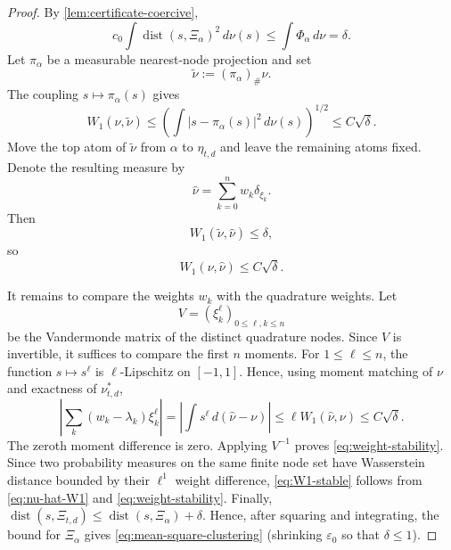 \documentclass[10pt,a4paper]{amsart}
\begin{document}
\begin{proof}
By \cref{lem:certificate-coercive},
\[
 c_0\int\operatorname{dist}(s,\Xi_\alpha)^2\,d\nu(s)
 \le\int\Phi_\alpha\,d\nu
 =\delta.
\]
Let $\pi_\alpha$ be a measurable nearest-node projection and set
\[
 \widetilde\nu:=(\pi_\alpha)_\#\nu.
\]
The coupling $s\mapsto\pi_\alpha(s)$ gives
\begin{equation}\label{eq:projection-W1}
 W_1(\nu,\widetilde\nu)
 \le\left(\int|s-\pi_\alpha(s)|^2\,d\nu(s)\right)^{1/2}
 \le C\sqrt\delta.
\end{equation}
Move the top atom of $\widetilde\nu$ from $\alpha$ to $\eta_{t,d}$ and leave the remaining atoms fixed.  Denote the resulting measure by
\[
 \widehat\nu=\sum_{k=0}^n w_k\delta_{\xi_k}.
\]
Then
\[
 W_1(\widetilde\nu,\widehat\nu)\le\delta,
\]
so
\begin{equation}\label{eq:nu-hat-W1}
 W_1(\nu,\widehat\nu)\le C\sqrt\delta.
\end{equation}

It remains to compare the weights $w_k$ with the quadrature weights.  Let
\[
 V=(\xi_k^\ell)_{0\le\ell,k\le n}
\]
be the Vandermonde matrix of the distinct quadrature nodes.  Since $V$ is invertible, it suffices to compare the first $n$ moments.  For $1\le\ell\le n$, the function $s\mapsto s^\ell$ is $\ell$-Lipschitz on $[-1,1]$.  Hence, using moment matching of $\nu$ and exactness of $\nu_{t,d}^*$,
\[
 \left|\sum_k(w_k-\lambda_k)\xi_k^\ell\right|
 =\left|\int s^\ell\,d(\widehat\nu-\nu)\right|
 \le \ell W_1(\widehat\nu,\nu)
 \le C\sqrt\delta.
\]
The zeroth moment difference is zero.  Applying $V^{-1}$ proves \eqref{eq:weight-stability}.  Since two probability measures on the same finite node set have Wasserstein distance bounded by their $\ell^1$ weight difference, \eqref{eq:W1-stable} follows from \eqref{eq:nu-hat-W1} and \eqref{eq:weight-stability}.  Finally, $\operatorname{dist}(s,\Xi_{t,d})\le \operatorname{dist}(s,\Xi_\alpha)+\delta$.  Hence, after squaring and integrating, the bound for $\Xi_\alpha$ gives \eqref{eq:mean-square-clustering} (shrinking $\varepsilon_0$ so that $\delta\le1$).  \qedhere
\end{proof}
\end{document}
